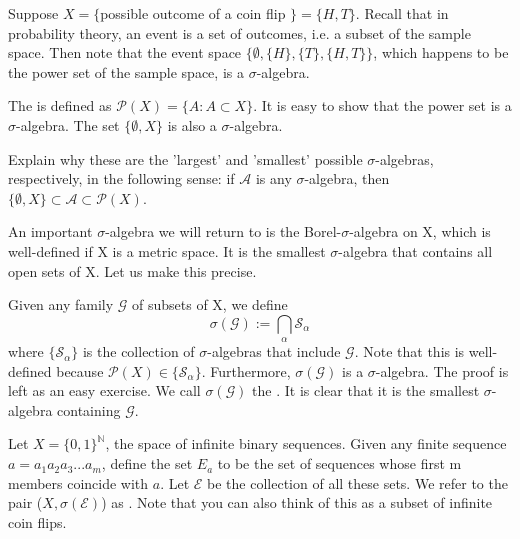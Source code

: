 \documentclass[11pt]{scrartcl}
\begin{document}
\begin{example}
Suppose $X = \{$possible outcome of a coin flip $\} = \{H,T\}$. Recall that in probability theory, an event is a set of outcomes, i.e. a subset of the sample space. Then note that the event space $ \{\emptyset,\{H\},\{T\},\{H,T\}\}$, which happens to be the power set of the sample space, is a $\sigma$-algebra.
\end{example}

\begin{example}
The  is defined as $\mathcal{P}(X) = \{A : A \subset X\}$. It is easy to show that the power set is a $\sigma$-algebra.
The set $\{\emptyset,X\}$ is also a $\sigma$-algebra. 

\end{example}

\begin{exercise}
Explain why these are the 'largest' and 'smallest' possible $\sigma$-algebras, respectively, in the following sense: if $\mathcal{A}$ is any $\sigma$-algebra, then $\{\emptyset,X\} \subset \mathcal{A} \subset \mathcal{P}(X)$.
\end{exercise}

An important $\sigma$-algebra we will return to is the Borel-$\sigma$-algebra on X, which is well-defined if X is a metric space. It is the smallest $\sigma$-algebra that contains all open sets of X. Let us make this precise.

\begin{definition}
Given any family $\mathcal{G}$ of subsets of X, we define
$$\sigma(\mathcal{G}) := \bigcap_\alpha \mathcal{S}_\alpha$$
where $\{\mathcal{S}_\alpha\}$ is the collection of $\sigma$-algebras that include $\mathcal{G}$. Note that this is well-defined because $\mathcal{P}(X) \in \{\mathcal{S}_\alpha\}$. Furthermore, $\sigma(\mathcal{G})$ is a $\sigma$-algebra. The proof is left as an easy exercise. We call $\sigma(\mathcal{G})$ the . It is clear that it is the smallest $\sigma$-algebra containing $\mathcal{G}$.
\end{definition}

\begin{example}
Let $X = \{0,1\}^\mathbb{N}$, the space of infinite binary sequences. Given any finite sequence $a = a_1a_2a_3...a_m$, define the set $E_a$ to be the set of sequences whose first m members coincide with $a$. Let $\mathcal{E}$ be the collection of all these sets. We refer to the pair ($X,\sigma(\mathcal{E})$) as .
Note that you can also think of this as a subset of infinite coin flips.
\end{example}
\end{document}
